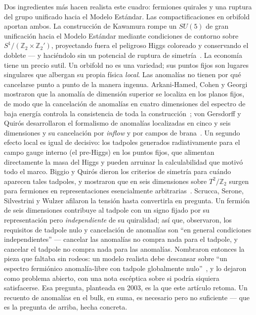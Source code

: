 \documentclass[11pt,a4paper]{article}
\begin{document}
Dos ingredientes m\'as hacen realista este cuadro: fermiones quirales y una ruptura del
grupo unificado hacia el Modelo Est\'andar. Las compactificaciones en orbifold aportan
ambos. La construcci\'on de Kawamura rompe un $SU(5)$ de gran unificaci\'on hacia el
Modelo Est\'andar mediante condiciones de contorno sobre
$S^1/(\mathbb{Z}_2\times\mathbb{Z}_2')$, proyectando fuera el peligroso Higgs coloreado
y conservando el doblete --- y haci\'endolo sin un potencial de ruptura de
simetr\'ia~\cite{KawamuraGUT}. La econom\'ia tiene un precio sutil. Un orbifold no es una
variedad; sus puntos fijos son lugares singulares que albergan su propia f\'isica
\emph{local}. Las anomal\'ias no tienen por qu\'e cancelarse punto a punto de la manera
ingenua. Arkani-Hamed, Cohen y Georgi mostraron que la anomal\'ia de dimensi\'on
superior se localiza en los planos fijos, de modo que la cancelaci\'on de anomal\'ias en
cuatro dimensiones del espectro de baja energ\'ia controla la consistencia de toda la
construcci\'on~\cite{ACG}; von Gersdorff y Quir\'os desarrollaron el formalismo de
anomal\'ias localizadas en cinco y seis dimensiones y su cancelaci\'on por
\emph{inflow} y por campos de brana~\cite{GdVQ,GdV6D}. Un segundo efecto local es
igual de decisivo: los tadpoles generados radiativamente para el campo gauge interno
(el pre-Higgs) en los puntos fijos, que alimentan directamente la masa del Higgs y
pueden arruinar la calculabilidad que motiv\'o todo el marco. Biggio y Quir\'os dieron
los criterios de simetr\'ia para cu\'ando aparecen tales tadpoles, y mostraron que en
seis dimensiones sobre $T^2/\mathbb{Z}_2$ surgen para fermiones en representaciones
esencialmente arbitrarias~\cite{BiggioQ}. Scrucca, Serone, Silvestrini y Wulzer afilaron la
tensi\'on hasta convertirla en pregunta. Un fermi\'on de seis dimensiones contribuye al
tadpole con un signo fijado por su representaci\'on pero \emph{independiente} de su
quiralidad; as\'i que, observaron, los requisitos de tadpole nulo y cancelaci\'on de
anomal\'ias son ``en general condiciones independientes'' --- cancelar las anomal\'ias no
compra nada para el tadpole, y cancelar el tadpole no compra nada para las anomal\'ias.
Nombraron entonces la pieza que faltaba sin rodeos: un modelo realista debe descansar sobre
``un espectro fermi\'onico anomal\'ia-libre con tadpole globalmente nulo''~\cite{SSSW}, y lo
dejaron como problema abierto, con una nota escéptica sobre si podr\'ia siquiera
satisfacerse. Esa pregunta, planteada en 2003, es la que este art\'iculo retoma. Un
recuento de anomal\'ias en el bulk, en suma, es necesario pero no suficiente --- que es la
pregunta de arriba, hecha concreta.
\end{document}
